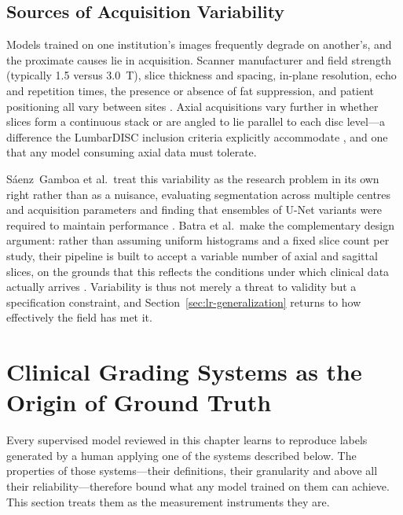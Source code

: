 \subsection{Sources of Acquisition Variability}
\label{sec:lr-variability}

Models trained on one institution's images frequently degrade on another's, and
the proximate causes lie in acquisition. Scanner manufacturer and field strength
(typically 1.5 versus 3.0~T), slice thickness and spacing, in-plane resolution,
echo and repetition times, the presence or absence of fat suppression, and
patient positioning all vary between sites \cite{senzgamboa2023automatic,mendes2026deep}.
Axial acquisitions vary further in whether slices form a continuous stack or are
angled to lie parallel to each disc level---a difference the LumbarDISC
inclusion criteria explicitly accommodate \cite{richards2026the}, and one that
any model consuming axial data must tolerate.

S\'aenz~Gamboa et al.\ treat this variability as the research problem in its own
right rather than as a nuisance, evaluating segmentation across multiple centres
and acquisition parameters and finding that ensembles of U-Net variants were
required to maintain performance \cite{senzgamboa2023automatic}. Batra et al.\
make the complementary design argument: rather than assuming uniform histograms
and a fixed slice count per study, their pipeline is built to accept a variable
number of axial and sagittal slices, on the grounds that this reflects the
conditions under which clinical data actually arrives \cite{batra2025mscan}.
Variability is thus not merely a threat to validity but a specification
constraint, and Section~\ref{sec:lr-generalization} returns to how effectively
the field has met it.

\section{Clinical Grading Systems as the Origin of Ground Truth}
\label{sec:lr-grading}

Every supervised model reviewed in this chapter learns to reproduce labels
generated by a human applying one of the systems described below. The
properties of those systems---their definitions, their granularity and above all
their reliability---therefore bound what any model trained on them can achieve.
This section treats them as the measurement instruments they are.

